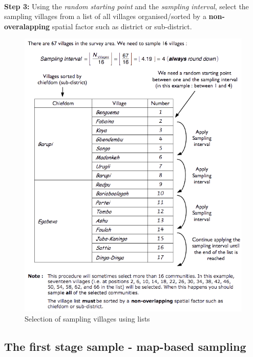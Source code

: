 \documentclass[12pt,a4paper]{book}
\theoremstyle{definition}
\theoremstyle{definition}
\theoremstyle{definition}
\theoremstyle{remark}
\begin{document}
~

\textbf{Step 3:} Using the \emph{random starting point} and the
\emph{sampling interval}, select the sampling villages from a list of
all villages organised/sorted by a \textbf{non-overalapping} spatial
factor such as district or sub-district.

\newpage

\begin{figure}[H]

{\centering \includegraphics{figures/listSample2} 

}

\caption{Selection of sampling villages using lists}\label{fig:sample4}
\end{figure}

\newpage

\hypertarget{the-first-stage-sample---map-based-sampling}{%
\subsection{The first stage sample - map-based
sampling}\label{the-first-stage-sample---map-based-sampling}}
\end{document}
